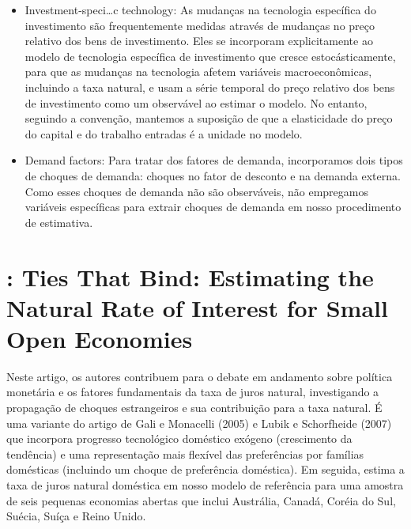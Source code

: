 \begin{itemize}
    \item Investment-speci…c technology: As mudanças na tecnologia específica do investimento são frequentemente medidas através de mudanças no preço relativo dos bens de investimento. Eles se incorporam explicitamente ao modelo de tecnologia específica de investimento que cresce estocásticamente, para que as mudanças na tecnologia afetem variáveis macroeconômicas, incluindo a taxa natural, e usam a série temporal do preço relativo dos bens de investimento como um observável ao estimar o modelo. No entanto, seguindo a convenção, mantemos a suposição de que a elasticidade do preço do capital e do trabalho entradas é a unidade no modelo.
    
    \item Demand factors: Para tratar dos fatores de demanda, incorporamos dois tipos de choques de demanda: choques no fator de desconto e na demanda externa. Como esses choques de demanda não são observáveis, não empregamos variáveis específicas para extrair choques de demanda em nosso procedimento de estimativa.
    
\end{itemize}


%
%
\section{\citet{Grossman:2019}: Ties That Bind: Estimating the Natural Rate of Interest for Small Open Economies}
Neste artigo, os autores contribuem para o debate em andamento sobre política monetária e os fatores fundamentais da taxa de juros natural, investigando a propagação de choques estrangeiros e sua contribuição para a taxa natural. É uma variante do artigo de Gali e Monacelli (2005) e Lubik e Schorfheide (2007) que incorpora progresso tecnológico doméstico exógeno (crescimento da tendência) e uma representação mais flexível das preferências por famílias domésticas (incluindo um choque de preferência doméstica). Em seguida, estima a taxa de juros natural doméstica em nosso modelo de referência para uma amostra de seis pequenas economias abertas que inclui Austrália, Canadá, Coréia do Sul, Suécia, Suíça e Reino Unido.

